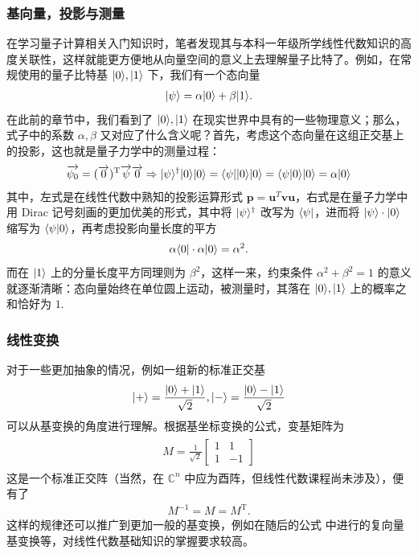 \subsubsection*{基向量，投影与测量}
在学习量子计算相关入门知识时，笔者发现其与本科一年级所学线性代数知识的高度关联性，这样就能更方便地从向量空间的意义上去理解量子比特了。例如，在常规使用的量子比特基 $|0\rangle,|1\rangle$ 下，我们有一个态向量 \begin{align*}
    |\psi\rangle=\alpha|0\rangle+\beta|1\rangle.
\end{align*}
在此前的章节中，我们看到了 $|0\rangle,|1\rangle$ 在现实世界中具有的一些物理意义；那么，式子中的系数 $\alpha,\beta$ 又对应了什么含义呢？首先，考虑这个态向量在这组正交基上的投影，这也就是量子力学中的测量过程： \begin{align*}
    \overrightarrow{\psi_0}=(\overrightarrow{0})^{\text{T}}\overrightarrow{\psi}\overrightarrow{0}\Rightarrow|\psi\rangle^{\dagger}|0\rangle|0\rangle=\langle\psi||0\rangle|0\rangle=\langle\psi|0\rangle|0\rangle=\alpha|0\rangle
\end{align*}
其中，左式是在线性代数中熟知的投影运算形式 $\bm{p}=\bm{u}^{T}\bm{v}\bm{u}$，右式是在量子力学中用 Dirac 记号刻画的更加优美的形式，其中将 $|\psi\rangle^\dagger$ 改写为 $\langle\psi|$，进而将 $|\psi\rangle\cdot|0\rangle$ 缩写为 $\langle\psi|0\rangle$，再考虑投影向量长度的平方 \begin{align*}
    \alpha\langle0|\cdot\alpha|0\rangle=\alpha^2.
\end{align*}
而在 $|1\rangle$ 上的分量长度平方同理则为 $\beta^2$，这样一来，约束条件 $\alpha^2+\beta^2=1$ 的意义就逐渐清晰：态向量始终在单位圆上运动，被测量时，其落在 $|0\rangle,|1\rangle$ 上的概率之和恰好为 $1$.

\subsubsection*{线性变换}
对于一些更加抽象的情况，例如一组新的标准正交基 \begin{align*}
    |+\rangle=\frac{|0\rangle+|1\rangle}{\sqrt{2}},|-\rangle=\frac{|0\rangle-|1\rangle}{\sqrt{2}}
\end{align*}
可以从基变换的角度进行理解。根据基坐标变换的公式，变基矩阵为 \begin{align}\begin{aligned}
    M=\frac{1}{\sqrt{2}}\begin{bmatrix}
        1 & 1\\
        1 & -1
    \end{bmatrix}\label{eq:change-of-basis}
\end{aligned}\end{align}
这是一个标准正交阵（当然，在 $\mathbb{C}^n$ 中应为酉阵，但线性代数课程尚未涉及），便有了 \begin{align*}
    M^{-1}=M=M^{\text{T}}.
\end{align*}
这样的规律还可以推广到更加一般的基变换，例如在随后的公式  中进行的复向量基变换等，对线性代数基础知识的掌握要求较高。

